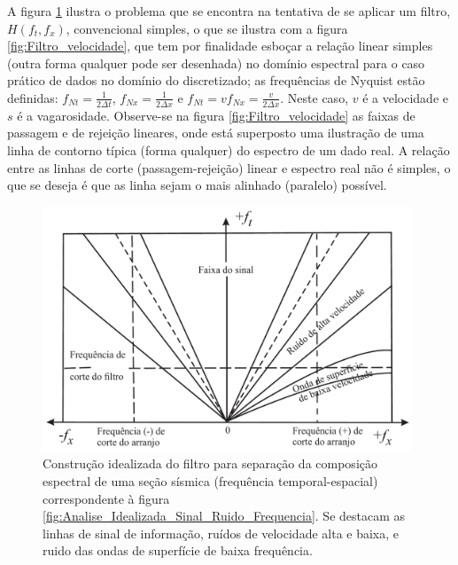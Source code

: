 A figura \ref{fig:Analise_Idealizada_Filtro_Separa} ilustra o problema que se encontra na tentativa de se aplicar um filtro, $H(f_{t},f_{x})$, convencional simples, o que se ilustra com a figura \ref{fig:Filtro_velocidade}, que tem por finalidade esboçar a relação linear simples (outra forma qualquer pode ser desenhada) no domínio espectral para o caso prático de dados no domínio do discretizado; as frequências de Nyquist estão definidas: 
$f_{Nt}=\frac{1}{2 \Delta t}$, $f_{Nx}=\frac{1}{2 \Delta x}$ e $f_{Nt}= vf_{Nx} =\frac{v}{2 \Delta x}$.
Neste caso, $v$ é a velocidade e $s$ é a vagarosidade.
Observe-se na figura \ref{fig:Filtro_velocidade} as faixas de passagem e de rejeição lineares, onde está superposto uma ilustração de uma linha de contorno típica (forma qualquer) do espectro de um dado real. 
A relação entre as linhas de corte (passagem-rejeição) linear e espectro real não é simples, o que se deseja é que as linha sejam o mais alinhado (paralelo) possível.
\begin{figure}[H]
\centering
\includegraphics[width=11cm]{figuras/cap2/Analise_Idealizada_Filtro_Separa.pdf}
\vspace{-0.3cm}
\caption{Construção idealizada do filtro para separação da composição espectral de uma seção sísmica (frequência temporal-espacial) correspondente à figura \ref{fig:Analise_Idealizada_Sinal_Ruido_Frequencia}. 
Se destacam as linhas de sinal de informação, ruídos de velocidade alta e baixa, e ruido das ondas de superfície de baixa frequência.}
\label{fig:Analise_Idealizada_Filtro_Separa}
\end{figure}
